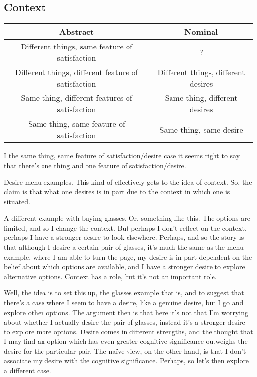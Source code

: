 \documentclass[10pt]{article}
\begin{document}
\subsection{Context}
\label{sec:context}

\begin{center}
  {\setlength{\tabcolsep}{2em}%
    \renewcommand{\arraystretch}{1.5}%
    \begin{tabular}[h]{c|c}
      Abstract & Nominal \\
      \hline
      Different things, same feature of satisfaction & ? \\
      Different things, different feature of satisfaction & Different things, different desires \\
      Same thing, different features of satisfaction & Same thing, different desires \\
      Same thing, same feature of satisfaction & Same thing, same desire \\
    \end{tabular}
}
\end{center}

I the same thing, same feature of satisfaction/desire case it seems right to say that there's one thing and one feature of satisfaction/desire.


\newpage




Desire menu examples.
This kind of effectively gets to the idea of context.
So, the claim is that what one desires is in part due to the context in which one is situated.

A different example with buying glasses.
Or, something like this.
The options are limited, and so I change the context.
But perhaps I don't reflect on the context, perhaps I have a stronger desire to look elsewhere.
Perhaps, and so the story is that although I desire a certain pair of glasses, it's much the same as the menu example, where I am able to turn the page, my desire is in part dependent on the belief about which options are available, and I have a stronger desire to explore alternative options.
Context has a role, but it's not an important role.

Well, the idea is to set this up, the glasses example that is, and to suggest that there's a case where I seem to have a desire, like a genuine desire, but I go and explore other options.
The argument then is that here it's not that I'm worrying about whether I actually desire the pair of glasses, instead it's a stronger desire to explore more options.
Desire comes in different strengths, and the thought that I may find an option which has even greater cognitive significance outweighs the desire for the particular pair.
The na\"{i}ve view, on the other hand, is that I don't associate my desire with the cognitive significance.
Perhaps, so let's then explore a different case.
\end{document}
